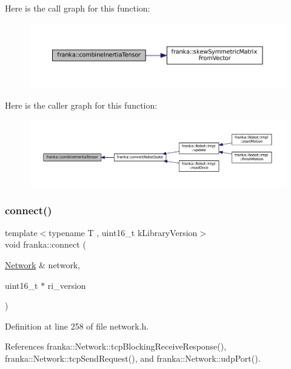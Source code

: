 Here is the call graph for this function\+:
\nopagebreak
\begin{figure}[H]
\begin{center}
\leavevmode
\includegraphics[width=350pt]{namespacefranka_a4be229abc6da1b78167353e5448ea1d5_cgraph}
\end{center}
\end{figure}
Here is the caller graph for this function\+:
\nopagebreak
\begin{figure}[H]
\begin{center}
\leavevmode
\includegraphics[width=350pt]{namespacefranka_a4be229abc6da1b78167353e5448ea1d5_icgraph}
\end{center}
\end{figure}
\mbox{\label{namespacefranka_a3e41d6a4328598c51909546b0e701179}} 
\subsubsection{\texorpdfstring{connect()}{connect()}}
{\footnotesize\ttfamily template$<$typename T , uint16\+\_\+t k\+Library\+Version$>$ \\
void franka\+::connect (\begin{DoxyParamCaption}\item[{\hyperlink{classfranka_1_1Network}{Network} \&}]{network,  }\item[{uint16\+\_\+t $\ast$}]{ri\+\_\+version }\end{DoxyParamCaption})}



Definition at line 258 of file network.\+h.



References franka\+::\+Network\+::tcp\+Blocking\+Receive\+Response(), franka\+::\+Network\+::tcp\+Send\+Request(), and franka\+::\+Network\+::udp\+Port().



